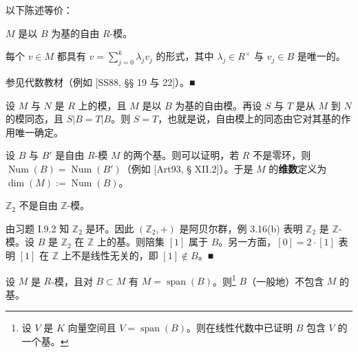 \begin{remark}

\begin{items}
\item

以下陈述等价：

\begin{subitems}
\item

$ M $ 是以 $ B $ 为基的自由 $ R $-模。

\item

每个 $ v \in M $ 都具有 $ v = \sum_{j=0}^{k}\lambda_{j}v_{j} $ 的形式，其中 $ \lambda_{j} \in R^{\times} $ 与 $ v_{j} \in B $ 是唯一的。

\proofhead
参见代数教材（例如 [SS88, §§ 19 与 22]）。\nobreak\hspace{0.35em}■
\end{subitems}

\item

设 $ M $ 与 $ N $ 是 $ R $ 上的模，且 $ M $ 是以 $ B $ 为基的自由模。再设 $ S $ 与 $ T $ 是从 $ M $ 到 $ N $ 的模同态，且 $ S|B = T|B $。则 $ S = T $，也就是说，自由模上的同态由它对其基的作用唯一确定。

\item

设 $ B $ 与 $ B' $ 是自由 $ R $-模 $ M $ 的两个基。则可以证明，若 $ R $ 不是零环，则 $ \operatorname{Num}(B) = \operatorname{Num}(B') $（例如 [Art93, § XII.2]）。于是 $ M $ 的\textbf{维数}定义为 $ \dim(M) := \operatorname{Num}(B) $。

\item

$ \mathbb{Z}_{2} $ 不是自由 $ \mathbb{Z} $-模。

\proofhead
由习题 I.9.2 知 $ \mathbb{Z}_{2} $ 是环。因此 $ (\mathbb{Z}_{2},+) $ 是阿贝尔群，例 3.16(b) 表明 $ \mathbb{Z}_{2} $ 是 $ \mathbb{Z} $-模。设 $ B $ 是 $ \mathbb{Z}_{2} $ 在 $ \mathbb{Z} $ 上的基。则陪集 $ [1] $ 属于 $ B $。另一方面，$ [0] = 2\cdot[1] $ 表明 $ [1] $ 在 $ \mathbb{Z} $ 上不是线性无关的，即 $ [1] \notin B $。\nobreak\hspace{0.35em}■
\item

设 $ M $ 是 $ R $-模，且对 $ B \subset M $ 有 $ M = \operatorname{span}(B) $。则\footnote{设 $ V $ 是 $ K $ 向量空间且 $ V = \operatorname{span}(B) $。则在线性代数中已证明 $ B $ 包含 $ V $ 的一个基。} $ B $（一般地）不包含 $ M $ 的基。


\end{items}
\end{remark}
